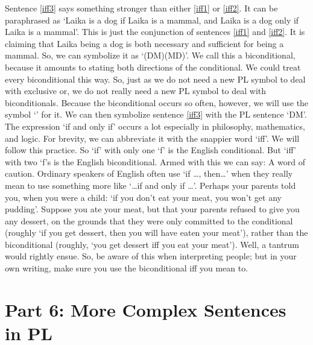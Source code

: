 Sentence \ref{iff3} says something stronger than either \ref{iff1} or \ref{iff2}. It can be paraphrased as ‘Laika is a dog if Laika is a mammal, and Laika is a dog only if Laika is a mammal’. This is just the conjunction of sentences \ref{iff1} and \ref{iff2}. It is claiming that Laika being a dog is both necessary and sufficient for being a mammal. So, we can symbolize it as ‘(D\eif M)\eand (M\eif D)’. We call this a \gls{biconditional}, because it amounts to stating both directions of the conditional.
We could treat every biconditional this way. So, just as we do not need a new PL symbol to deal with exclusive or, we do not really need a new PL symbol to deal with biconditionals. Because the biconditional occurs so often, however, we will use the symbol ‘\eiff’ for it. We can then symbolize sentence \ref{iff3} with the PL sentence ‘D\eiff M’.
The expression ‘if and only if’ occurs a lot especially in philosophy, mathematics, and logic. For brevity, we can abbreviate it with the snappier word ‘iff’. We will follow this practice. So ‘if’ with only one ‘f’ is the English conditional. But ‘iff’ with two ‘f’s is the English biconditional. Armed with this we can say:
A word of caution. Ordinary speakers of English often use ‘if \ldots , then\ldots ’ when they really mean to use something more like ‘\ldots if and only if \ldots ’. Perhaps your parents told you, when you were a child: ‘if you don’t eat your meat, you won’t get any pudding’. Suppose you ate your meat, but that your parents refused to give you any dessert, on the grounds that they were only committed to the conditional (roughly ‘if you get dessert, then you will have eaten your meat’), rather than the biconditional (roughly, ‘you get dessert iff you eat your meat’). Well, a tantrum would rightly ensue. So, be aware of this when interpreting people; but in your own writing, make sure you use the biconditional iff you mean to.

\russell

\chapter{Part 6: More Complex Sentences in PL}
